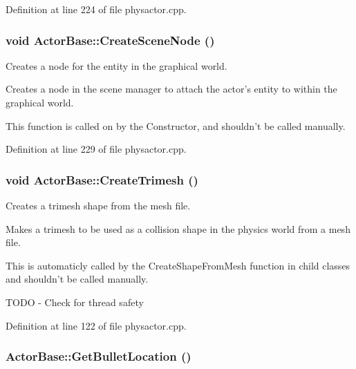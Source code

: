 Definition at line 224 of file physactor.cpp.

\hypertarget{classActorBase_a168cd57e20b2adfc5cae21627ddbae31}{
\subsubsection[{CreateSceneNode}]{\setlength{\rightskip}{0pt plus 5cm}void ActorBase::CreateSceneNode ()}}
\label{dd/d7b/classActorBase_a168cd57e20b2adfc5cae21627ddbae31}


Creates a node for the entity in the graphical world. 

Creates a node in the scene manager to attach the actor's entity to within the graphical world. \par
 This function is called on by the Constructor, and shouldn't be called manually. 

Definition at line 229 of file physactor.cpp.

\hypertarget{classActorBase_af7f0806222c79b5d5120dccefd93715e}{
\subsubsection[{CreateTrimesh}]{\setlength{\rightskip}{0pt plus 5cm}void ActorBase::CreateTrimesh ()}}
\label{dd/d7b/classActorBase_af7f0806222c79b5d5120dccefd93715e}


Creates a trimesh shape from the mesh file. 

Makes a trimesh to be used as a collision shape in the physics world from a mesh file. \par
 This is automaticly called by the CreateShapeFromMesh function in child classes and shouldn't be called manually. 

TODO -\/ Check for thread safety 



Definition at line 122 of file physactor.cpp.

\hypertarget{classActorBase_ae84ff822d2f962360bf291bb2c88eb3e}{
\subsubsection[{GetBulletLocation}]{ ActorBase::GetBulletLocation ()}}
\label{dd/d7b/classActorBase_ae84ff822d2f962360bf291bb2c88eb3e}


